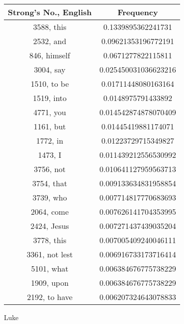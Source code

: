 \documentclass[12pt,letterpaper]{article}
\begin{document}
 \begin{longtable}{|c|c|}
\hline
 Strong's No., English & Frequency \\ \hline  
3588, this & 0.1339895362241731\\ \hline 
 2532, and & 0.09621353196772191\\ \hline 
 846, himself & 0.0671277822115811\\ \hline 
 3004, say & 0.025450031036623216\\ \hline 
 1510, to be & 0.01711448080163164\\ \hline 
 1519, into & 0.0148975791433892\\ \hline 
 4771, you & 0.014542874878070409\\ \hline 
 1161, but & 0.01445419881174071\\ \hline 
 1772, in & 0.01223729715349827\\ \hline 
 1473, I & 0.011439212556530992\\ \hline 
 3756, not & 0.010641127959563713\\ \hline 
 3754, that & 0.009133634831958854\\ \hline 
 3739, who & 0.007714817770683693\\ \hline 
 2064, come & 0.007626141704353995\\ \hline 
 2424, Jesus & 0.007271437439035204\\ \hline 
 3778, this & 0.007005409240046111\\ \hline 
 3361, not lest & 0.006916733173716414\\ \hline 
 5101, what & 0.006384676775738229\\ \hline 
 1909, upon & 0.006384676775738229\\ \hline 
 2192, to have & 0.006207324643078833\\ \hline 
\end{longtable} 
 

Luke
\end{document}
